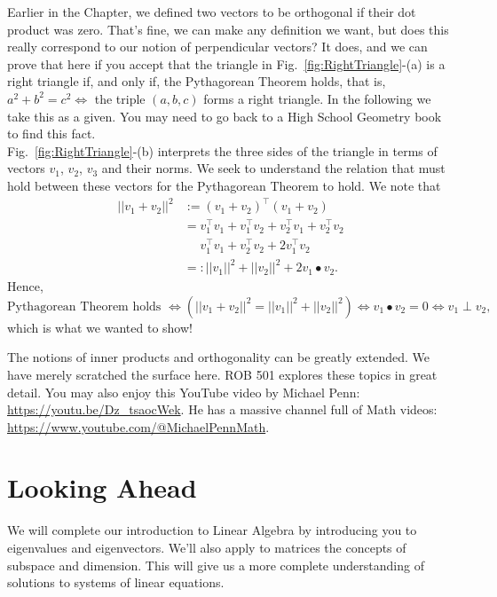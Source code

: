 Earlier in the Chapter, we defined two vectors to be orthogonal if their dot product was zero. That's fine, we can make any definition we want, but does this really correspond to our notion of perpendicular vectors? It does, and we can prove that here if you accept that the triangle in Fig.~\ref{fig:RightTriangle}-(a) is a right triangle if, and only if, the Pythagorean Theorem holds, that is, $a^2 + b^2 = c^2 \iff$ the triple $(a,b,c)$ forms a right triangle. In the following we take this as a given. You may need to go back to a High School Geometry book to find this fact.\\


Fig.~\ref{fig:RightTriangle}-(b) interprets the three sides of the triangle in terms of vectors $v_1$, $v_2$, $v_3$ and their norms. We seek to understand the relation that must hold between these vectors for the Pythagorean Theorem to hold. We note that
\begin{equation}
    \begin{aligned}
    ||v_1 + v_2||^2 & := (v_1 + v_2)^\top (v_1 + v_2) \\
    & = v_1^ \top v_1 + v_1^\top v_2 + v_2^\top v_1 + v_2^\top v_2\\
    & ~~~~~~ v_1^\top v_1 +  v_2^\top v_2 + 2 v_1^\top v_2 \\
    & =: ||v_1||^2 + ||v_2||^2 + 2 v_1 \bullet v_2.
    \end{aligned}
\end{equation}
Hence, 
$$\text{Pythagorean Theorem holds } \iff \left(||v_1 + v_2||^2 = ||v_1||^2 + ||v_2||^2 \right) \iff  v_1 \bullet v_2 =0 \iff v_1 \perp v_2,$$
which is what we wanted to show!\\

\begin{tcolorbox}[title={\bf How general do you want to go?}]
      The notions of inner products and orthogonality can be greatly extended. We have merely scratched the surface here. ROB 501 explores these topics in great detail. You may also enjoy this YouTube video by Michael Penn: \url{https://youtu.be/Dz_tsaocWek}. He has a massive channel full of Math videos: \url{https://www.youtube.com/@MichaelPennMath}.  
\end{tcolorbox}


\section{Looking Ahead}

We will complete our introduction to Linear Algebra by introducing you to eigenvalues and eigenvectors. We'll also apply to matrices the concepts of subspace and dimension. This will give us a more complete understanding of solutions to systems of linear equations.